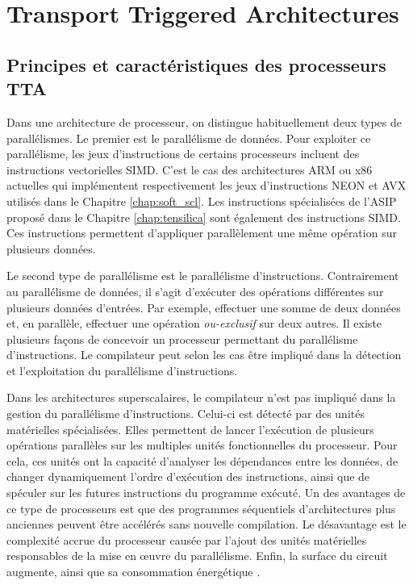 \section{Transport Triggered Architectures}
\label{sec:tta_description}

\subsection{Principes et caractéristiques des processeurs TTA}

Dans une architecture de processeur, on distingue habituellement deux types de parallélismes.
Le premier est le parallélisme de données.
Pour exploiter ce parallélisme, les jeux d'instructions de certains processeurs incluent des instructions vectorielles SIMD.
C'est le cas des architectures ARM ou x86 actuelles qui implémentent respectivement les jeux d'instructions NEON et AVX utilisés dans le Chapitre \ref{chap:soft_scl}.
Les instructions spécialisées de l'ASIP proposé dans le Chapitre \ref{chap:tensilica} sont également des instructions SIMD.
Ces instructions permettent d'appliquer parallèlement une même opération sur plusieurs données.

Le second type de parallélisme est le parallélisme d'instructions. Contrairement au parallélisme de données, il s'agit d'exécuter des opérations différentes sur plusieurs données d'entrées. Par exemple, effectuer une somme de deux données et, en parallèle, effectuer une opération \textit{ou-exclusif} sur deux autres.
Il existe plusieurs façons de concevoir un processeur permettant du parallélisme d'instructions. Le compilateur peut selon les cas être impliqué dans la détection et l'exploitation du parallélisme d'instructions.

Dans les architectures superscalaires, le compilateur n'est pas impliqué dans la gestion du parallélisme d'instructions. Celui-ci est détecté par des unités matérielles spécialisées. 
Elles permettent de lancer l'exécution de plusieurs opérations parallèles sur les multiples unités fonctionnelles du processeur.
Pour cela, ces unités ont la capacité d'analyser les dépendances entre les données, de changer dynamiquement l'ordre d'exécution des instructions, ainsi que de spéculer sur les futures instructions du programme exécuté. 
Un des avantages de ce type de processeurs est que des programmes séquentiels d'architectures plus anciennes peuvent être accélérés sans nouvelle compilation. Le désavantage est le complexité accrue du processeur causée par l'ajout des unités matérielles responsables de la mise en œuvre du parallélisme. Enfin, la surface du circuit augmente, ainsi que sa consommation énergétique \cite{rau1993instruction}.

